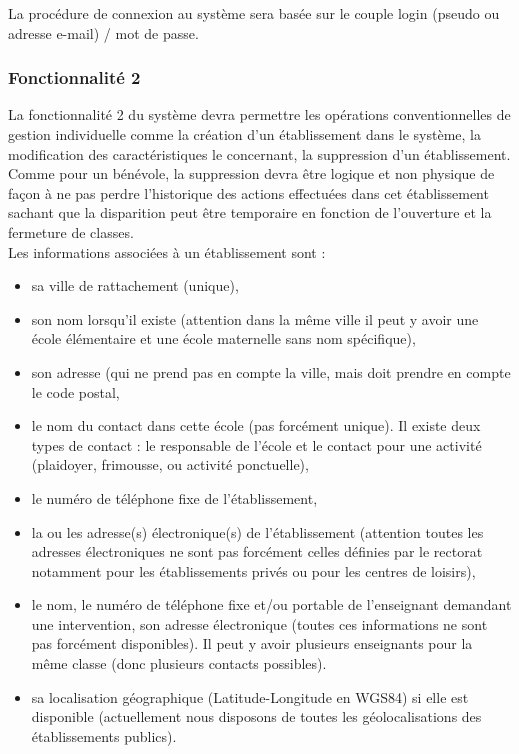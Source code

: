 La procédure de connexion au système sera basée sur le couple login (pseudo ou adresse e-mail) / mot de passe.
\\

\subsubsection{Fonctionnalité 2}
La fonctionnalité 2 du système devra permettre les opérations conventionnelles de gestion individuelle comme la création d'un établissement dans le système, la modification des
caractéristiques le concernant, la suppression d'un établissement. Comme pour un bénévole, la suppression devra être logique et non physique de façon à ne pas perdre l'historique des actions effectuées dans cet établissement sachant que la disparition peut être temporaire en fonction de l'ouverture et la fermeture de classes. \\


Les informations associées à un établissement sont :
\begin{itemize}
\item sa ville de rattachement (unique), 
\item son nom lorsqu'il existe (attention dans la même ville il peut y avoir une école élémentaire et une école maternelle sans nom spécifique), 
\item son adresse (qui ne prend pas en compte la ville, mais doit prendre en compte le code postal, 
\item le nom du contact dans cette école (pas forcément unique). Il existe deux types de contact : le responsable de l'école et le contact pour une activité (plaidoyer, frimousse, ou activité ponctuelle), 
\item le numéro de téléphone fixe de l'établissement, 
\item la ou les adresse(s) électronique(s) de l'établissement (attention toutes les adresses électroniques ne sont pas forcément celles définies par le rectorat notamment pour les établissements privés ou pour les centres de loisirs), 
\item le nom, le numéro de téléphone fixe et/ou portable de l'enseignant demandant une intervention, son adresse électronique (toutes ces informations ne sont pas forcément disponibles). Il peut y avoir plusieurs enseignants pour la même classe (donc plusieurs contacts possibles).
\item sa localisation géographique (Latitude-Longitude en WGS84) si elle est disponible
(actuellement nous disposons de toutes les géolocalisations des établissements publics).\\
\end{itemize}

